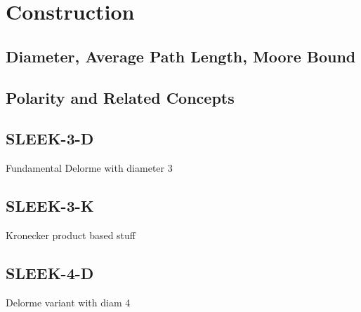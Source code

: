 \section{Construction}

\subsection{Diameter, Average Path Length, Moore Bound}


\subsection{Polarity and Related Concepts}

\subsection{SLEEK-3-D}

Fundamental Delorme with diameter 3

\subsection{SLEEK-3-K}

Kronecker product based stuff

\subsection{SLEEK-4-D}

Delorme variant with diam 4
